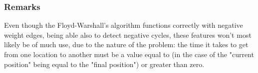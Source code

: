 \subsubsection{Remarks}
Even though the Floyd-Warshall's algorithm functions correctly with negative weight edges, being able also to detect negative cycles, these features won't most likely be of much use, due to the nature of the problem:
the time it takes to get from one location to another must be a value equal to (in the case of the "current position" being equal to the "final position") or greater than zero.